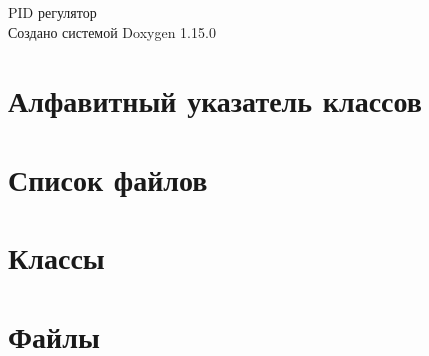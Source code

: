 \documentclass[twoside]{book}
\newcommand{\+}{\discretionary{\mbox{\scriptsize$\hookleftarrow$}}{}{}}
\newcommand{\clearemptydoublepage}{%
    \newpage{\pagestyle{empty}\cleardoublepage}%
  }
\begin{document}
  \raggedbottom
    \hypersetup{pageanchor=false,
                bookmarksnumbered=true,
                pdfencoding=unicode
               }
  \begin{titlepage}
  \vspace*{7cm}
  \begin{center}%
  {\Large PID регулятор}\\
  \vspace*{1cm}
  {\large Создано системой Doxygen 1.15.0}\\
  \end{center}
  \end{titlepage}
  \clearemptydoublepage
  \tableofcontents
  \clearemptydoublepage
  \hypersetup{pageanchor=true}
\chapter{Алфавитный указатель классов}

\chapter{Список файлов}

\chapter{Классы}


\chapter{Файлы}





  \backmatter
  \newpage
  \clearemptydoublepage
  \printindex
\end{document}
